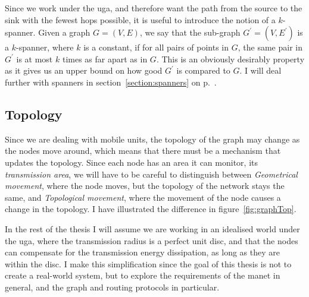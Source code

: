 Since we work under the \ac{uga}, and therefore want the path from the source to the sink with the fewest hops possible, it is useful to introduce the notion of a $k$-spanner. Given a graph $G = (V, E)$, we say that the sub-graph $G^{\prime} = (V, E^{\prime})$ is a $k$-spanner, where $k$ is a constant, if for all pairs of points in $G$, the same pair in $G^{\prime}$ is at most $k$ times as far apart as in $G$. This is an obviously desirably property as it gives us an upper bound on how good $G^{\prime}$ is compared to $G$. I will deal further with spanners in section~\ref{section:spanners} on p.~\pageref{section:spanners}.


\subsection{Topology}
\label{section:topology}

Since we are dealing with mobile units, the topology of the graph may change as the nodes move around, which means that there must be a mechanism that updates the topology. Since each node has an area it can monitor, its \emph{transmission area}, we will have to be careful to distinguish between \emph{Geometrical movement}, where the node moves, but the topology of the network stays the same, and \emph{Topological movement}, where the movement of the node causes a change in the topology. I have illustrated the difference in figure~\ref{fig:graphTop}.

In the rest of the thesis I will assume we are working in an idealised world under the \ac{uga}, where the transmission radius is a perfect unit disc, and that the nodes can compensate for the transmission energy dissipation, as long as they are within the disc. I make this simplification since the goal of this thesis is not to create a real-world system, but to explore the requirements of the \ac{manet} in general, and the graph and routing protocols in particular.
